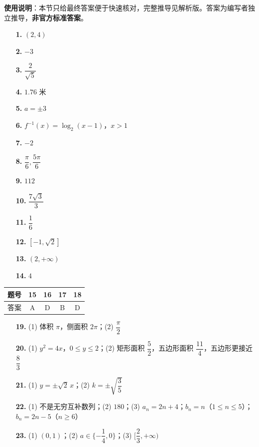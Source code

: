
\begin{gknotice}
\textbf{使用说明}：本节只给最终答案便于快速核对，完整推导见解析版。答案为编写者独立推导，\textbf{非官方标准答案}。
\end{gknotice}

\begin{itemize}[leftmargin=2.6em]
  \item[\textbf{1.}] \( (2,4) \)
  \item[\textbf{2.}] \(-3\)
  \item[\textbf{3.}] \(\dfrac{2}{\sqrt5}\)
  \item[\textbf{4.}] \(1.76\) 米
  \item[\textbf{5.}] \(a=\pm3\)
  \item[\textbf{6.}] \(f^{-1}(x)=\log_2(x-1)\)，\(x>1\)
  \item[\textbf{7.}] \(-2\)
  \item[\textbf{8.}] \(\dfrac{\pi}{6},\dfrac{5\pi}{6}\)
  \item[\textbf{9.}] \(112\)
  \item[\textbf{10.}] \(\dfrac{7\sqrt3}{3}\)
  \item[\textbf{11.}] \(\dfrac16\)
  \item[\textbf{12.}] \([-1,\sqrt2]\)
  \item[\textbf{13.}] \((2,+\infty)\)
  \item[\textbf{14.}] \(4\)
\end{itemize}

\begin{center}\begin{tabular}{ccccc}
\toprule
题号 & 15 & 16 & 17 & 18 \\
\midrule
答案 & A & D & B & D \\
\bottomrule
\end{tabular}\end{center}

\begin{itemize}[leftmargin=2.6em]
  \item[\textbf{19.}] (1) 体积 \(\pi\)，侧面积 \(2\pi\)；(2) \(\dfrac{\pi}{2}\)
  \item[\textbf{20.}] (1) \(y^2=4x\)，\(0\le y\le2\)；(2) 矩形面积 \(\dfrac52\)，五边形面积 \(\dfrac{11}{4}\)，五边形更接近 \(\dfrac83\)
  \item[\textbf{21.}] (1) \(y=\pm\sqrt2\,x\)；(2) \(k=\pm\sqrt{\dfrac35}\)
  \item[\textbf{22.}] (1) 不是无穷互补数列；(2) \(180\)；(3) \(a_n=2n+4\)；\(b_n=n\)（\(1\le n\le5\)）；\(b_n=2n-5\)（\(n\ge6\)）
  \item[\textbf{23.}] (1) \((0,1)\)；(2) \(a\in\{-\dfrac14,0\}\)；(3) \([\dfrac23,+\infty)\)
\end{itemize}
